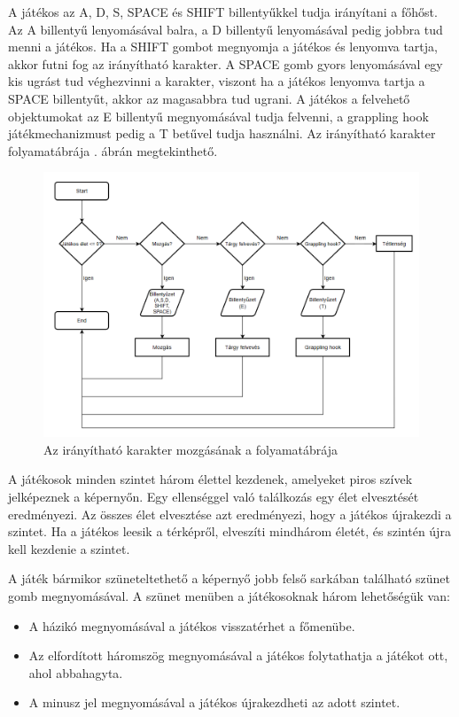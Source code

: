 A játékos az A, D, S, SPACE és SHIFT billentyűkkel tudja irányítani a főhőst. Az A billentyű lenyomásával balra, a D billentyű lenyomásával pedig jobbra tud menni a játékos. Ha a SHIFT gombot megnyomja a játékos és lenyomva tartja, akkor futni fog az irányítható karakter. A SPACE gomb gyors lenyomásával egy kis ugrást tud véghezvinni a karakter, viszont ha a játékos lenyomva tartja a SPACE billentyűt, akkor az magasabbra tud ugrani. A játékos a felvehető objektumokat az E billentyű megnyomásával tudja felvenni, a grappling hook játékmechanizmust pedig a T betűvel tudja használni. Az irányítható karakter folyamatábrája . ábrán megtekinthető.

\begin{figure}[ht]
\centering
\includegraphics[width =\textwidth]{images/playerflowchart.png}
\caption{ Az irányítható karakter mozgásának a folyamatábrája}
\label{fig:playerflowchart}
\end{figure}

A játékosok minden szintet három élettel kezdenek, amelyeket piros szívek jelképeznek a képernyőn. Egy ellenséggel való találkozás egy élet elvesztését eredményezi. Az összes élet elvesztése azt eredményezi, hogy a játékos újrakezdi a szintet. Ha a játékos leesik a térképről, elveszíti mindhárom életét, és szintén újra kell kezdenie a szintet.

A játék bármikor szüneteltethető a képernyő jobb felső sarkában található szünet gomb megnyomásával. A szünet menüben a játékosoknak három lehetőségük van:
\begin{itemize}
\item A házikó megnyomásával a játékos visszatérhet a főmenübe.
\item Az elfordított háromszög megnyomásával a játékos folytathatja a játékot ott, ahol abbahagyta.
\item A minusz jel megnyomásával a játékos újrakezdheti az adott szintet.
\end{itemize}

